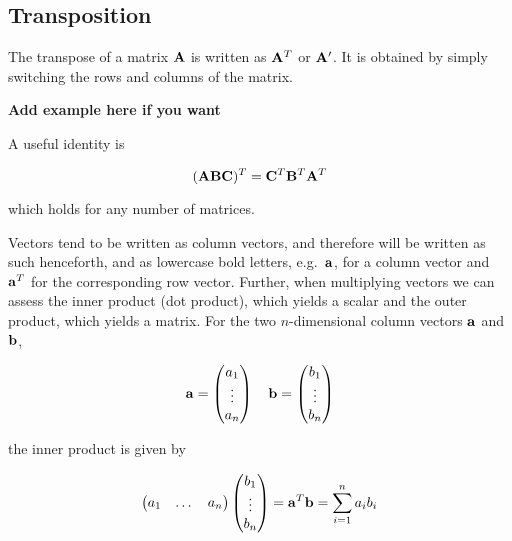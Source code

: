 \documentclass[
]{book}
\begin{document}
\hypertarget{transposition}{%
\subsection{Transposition}\label{transposition}}

The transpose of a matrix \(\mathbf{A}\) is written as \(\mathbf{A}^T\) or \(\mathbf{A}'\). It is obtained by simply switching the rows and columns of the matrix.

\textbf{Add example here if you want}

A useful identity is

\begin{equation}
    (\mathbf{A}\mathbf{B}\mathbf{C})^T = \mathbf{C}^T\mathbf{B}^T\mathbf{A}^T
    \label{eq:transpose-of-ABC}
\end{equation}

which holds for any number of matrices.

Vectors tend to be written as column vectors, and therefore will be written as such henceforth, and as lowercase bold letters, e.g.~\(\mathbf{a}\), for a column vector and \(\mathbf{a}^T\) for the corresponding row vector. Further, when multiplying vectors we can assess the inner product (dot product), which yields a scalar and the outer product, which yields a matrix. For the two \(n\)-dimensional column vectors \(\mathbf{a}\) and \(\mathbf{b}\),

\begin{equation}
    \mx{a} = 
    \begin{pmatrix}
    a_1 \\
    \vdots \\
    a_n
    \end{pmatrix}
    \ \ \ 
    \mx{b} = 
    \begin{pmatrix}
    b_1 \\
    \vdots \\
    b_n
    \end{pmatrix}
    \notag
\end{equation}

the inner product is given by

\begin{equation}
    \begin{pmatrix}
    a_1 & \dots & a_n
    \end{pmatrix}
    \begin{pmatrix}
    b_1 \\
    \vdots \\
    b_n
    \end{pmatrix}
     
    = \mx{a}^T\mx{b} = \sum^n_{i=1} {a_ib_i}
    \label{eq:inner-product}
\end{equation}
\end{document}
